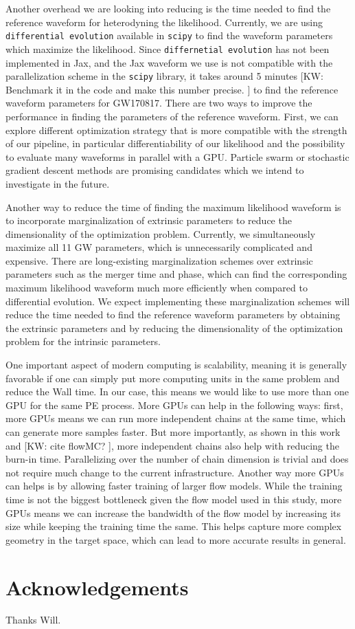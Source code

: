 \documentclass[twocolumn]{aastex631}
\newcommand{\kw}[1]{{\color{rb4}[KW: #1 ]}}
\begin{document}

Another overhead we are looking into reducing is the time needed to find the
reference waveform for heterodyning the likelihood. Currently, we are using
\texttt{differential evolution} available in \texttt{scipy} to find the waveform
parameters which maximize the likelihood. Since \texttt{differnetial evolution}
has not been implemented in Jax, and the Jax waveform we use is not compatible
with the parallelization scheme in the \texttt{scipy} library, it takes around 5
minutes \kw{Benchmark it in the code and make this number precise.} to find the
reference waveform parameters for GW170817. There are two ways to improve the
performance in finding the parameters of the reference waveform. First, we can
explore different optimization strategy that is more compatible with the
strength of our pipeline, in particular differentiability of our likelihood and
the possibility to evaluate many waveforms in parallel with a GPU. Particle
swarm or stochastic gradient descent methods are promising candidates which we
intend to investigate in the future. 

Another way to reduce the time of finding the maximum likelihood waveform is to
incorporate marginalization of extrinsic parameters to reduce the dimensionality
of the optimization problem. Currently, we simultaneously maximize all 11 GW
parameters, which is unnecessarily complicated and expensive. There are
long-existing marginalization schemes over extrinsic parameters such as the merger
time and phase, which can find the corresponding maximum likelihood waveform
much more efficiently when compared to differential evolution. We expect
implementing these marginalization schemes will reduce the time needed to find
the reference waveform parameters by obtaining the extrinsic parameters and by
reducing the dimensionality of the optimization problem for the intrinsic
parameters.

One important aspect of modern computing is scalability, meaning it is generally
favorable if one can simply put more computing units in the same problem and
reduce the Wall time. In our case, this means we would like to use more than one
GPU for the same PE process. More GPUs can help in the following ways: first,
more GPUs means we can run more independent chains at the same time, which can
generate more samples faster. But more importantly, as shown in this work and
\kw{cite flowMC?}, more independent chains also help with reducing the burn-in
time. Parallelizing over the number of chain dimension is trivial and does not
require much change to the current infrastructure. Another way more GPUs can
helps is by allowing faster training of larger flow models. While the training time
is not the biggest bottleneck given the flow model used in this study, more GPUs
means we can increase the bandwidth of the flow model by increasing its size
while keeping the training time the same. This helps capture more complex
geometry in the target space, which can lead to more accurate results in general.


\section{Acknowledgements}
Thanks Will.


\end{document}
